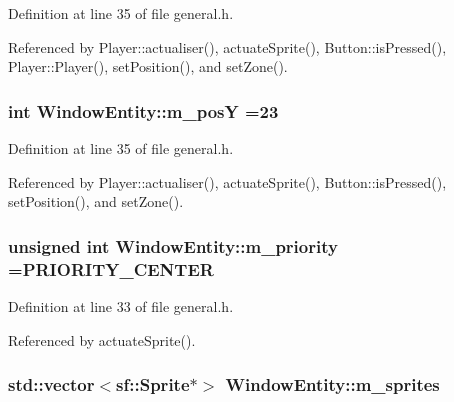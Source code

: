 Definition at line 35 of file general.\-h.



Referenced by Player\-::actualiser(), actuate\-Sprite(), Button\-::is\-Pressed(), Player\-::\-Player(), set\-Position(), and set\-Zone().

\hypertarget{class_window_entity_a1ff34f975605e7f201228dc71798d6f2}{
\subsubsection[{m\-\_\-pos\-Y}]{\setlength{\rightskip}{0pt plus 5cm}int Window\-Entity\-::m\-\_\-pos\-Y =23\hspace{0.3cm}{\ttfamily [protected]}}}\label{class_window_entity_a1ff34f975605e7f201228dc71798d6f2}


Definition at line 35 of file general.\-h.



Referenced by Player\-::actualiser(), actuate\-Sprite(), Button\-::is\-Pressed(), set\-Position(), and set\-Zone().

\hypertarget{class_window_entity_a5903868e7d02e6e5b042a29f0b77f326}{
\subsubsection[{m\-\_\-priority}]{\setlength{\rightskip}{0pt plus 5cm}unsigned int Window\-Entity\-::m\-\_\-priority ={\bf P\-R\-I\-O\-R\-I\-T\-Y\-\_\-\-C\-E\-N\-T\-E\-R}\hspace{0.3cm}{\ttfamily [protected]}}}\label{class_window_entity_a5903868e7d02e6e5b042a29f0b77f326}


Definition at line 33 of file general.\-h.



Referenced by actuate\-Sprite().

\hypertarget{class_window_entity_aee3783d95265718dadb89afa15974d3a}{
\subsubsection[{m\-\_\-sprites}]{\setlength{\rightskip}{0pt plus 5cm}std\-::vector$<$sf\-::\-Sprite$\ast$$>$ Window\-Entity\-::m\-\_\-sprites\hspace{0.3cm}{\ttfamily [protected]}}}\label{class_window_entity_aee3783d95265718dadb89afa15974d3a}


